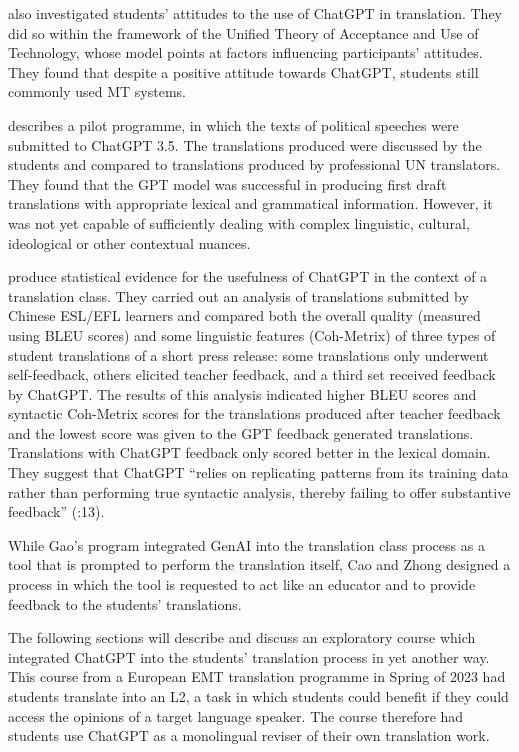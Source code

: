 \documentclass[output=paper]{langscibook}
\begin{document}
\citet{wang2024understandingstudentsacceptancechatgpt} also investigated students’ attitudes to the use of ChatGPT in translation. They did so within the framework of the Unified Theory of Acceptance and Use of Technology, whose model points at factors influencing participants’ attitudes. They found that despite a positive attitude towards ChatGPT, students still commonly used MT systems. 

\citet{gao24} describes a pilot programme, in which the texts of political speeches were submitted to ChatGPT 3.5. The translations produced were discussed by the students and compared to translations produced by professional UN translators. They found that the GPT model was successful in producing first draft translations with appropriate lexical and grammatical information. However, it was not yet capable of sufficiently dealing with complex linguistic, cultural, ideological or other contextual nuances. 

\citet{cao2023exploringeffectivenesschatgptbasedfeedback} produce statistical evidence for the usefulness of ChatGPT in the context of a translation class. They carried out an analysis of translations submitted by Chinese ESL/EFL learners and compared both the overall quality (measured using BLEU scores) and some linguistic features (Coh-Metrix) of three types of student translations of a short press release: some translations only underwent self-feedback, others elicited teacher feedback, and a third set received feedback by ChatGPT. The results of this analysis indicated higher BLEU scores and syntactic Coh-Metrix scores for the translations produced after teacher feedback and the lowest score was given to the GPT feedback generated translations. Translations with ChatGPT feedback only scored better in the lexical domain. They suggest that ChatGPT “relies on replicating patterns from its training data rather than performing true syntactic analysis, thereby failing to offer substantive feedback” (\citealt{cao2023exploringeffectivenesschatgptbasedfeedback}:13).

While Gao’s program integrated GenAI into the translation class process as a tool that is prompted to perform the translation itself, Cao and Zhong designed a process in which the tool is requested to act like an educator and to provide feedback to the students’ translations. 

The following sections will describe and discuss an exploratory course which integrated ChatGPT into the students’ translation process in yet another way. This course from a European EMT translation programme in Spring of 2023 had students translate into an L2, a task in which students could benefit if they could access the opinions of a target language speaker. The course therefore had students use ChatGPT as a monolingual reviser of their own translation work.  
\end{document}
